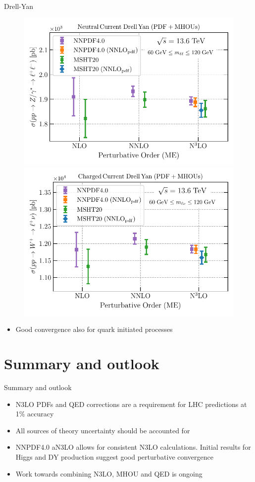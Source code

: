 \documentclass[aspectratio=169, 9pt,t]{beamer}
\begin{document}
\begin{frame}{Drell-Yan}
  \begin{figure}[!t]
    \centering
    \includegraphics[width=0.49\linewidth]{figures/Z_60_120-n3lo.pdf}
    \includegraphics[width=0.49\linewidth]{figures/Wp_60_120-n3lo.pdf}
  \end{figure}
  \begin{itemize}
    \item Good convergence also for quark initiated processes
  \end{itemize}
\end{frame}



\section{Summary and outlook}
\begin{frame}{Summary and outlook}
  \begin{itemize}
    \item N3LO PDFs and QED corrections are a requirement for LHC predictions at 1\% accuracy
    \item All sources of theory uncertainty should be accounted for
    \item NNPDF4.0 aN3LO allows for consistent N3LO calculations. Initial results for Higgs and DY production suggest good perturbative convergence
    \item Work towards combining N3LO, MHOU and QED is ongoing
  \end{itemize}
\end{frame}
\end{document}

